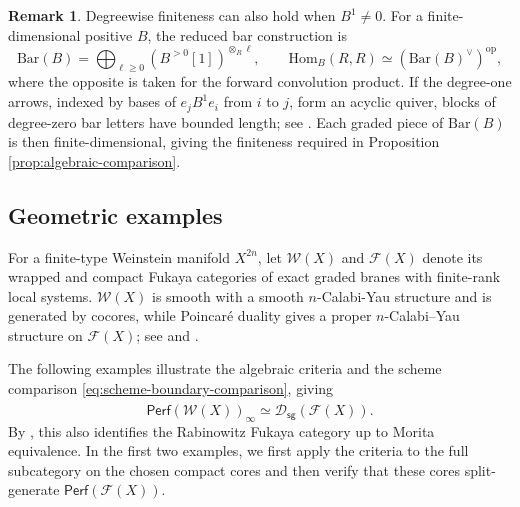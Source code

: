 \documentclass[11pt,letterpaper,reqno]{amsart}
\theoremstyle{plain}
\theoremstyle{definition}
\newtheorem{remark}[remark]{Remark}
\theoremstyle{plain}
\theoremstyle{definition}
\numberwithin{equation}{section}
\begin{document}
\begin{remark}\label{rem:bar-finiteness}
Degreewise finiteness can also hold when $B^1\ne0$.
For a finite-dimensional positive $B$, the reduced bar construction is
\[
\mathrm{Bar}(B)=\bigoplus_{\ell\geqslant0}(B^{>0}[1])^{\otimes_R\ell},\qquad
\mathrm{Hom}_B(R,R)\simeq(\mathrm{Bar}(B)^\vee)^{\mathrm{op}},
\]
where the opposite is taken for the forward convolution product.
If the degree-one arrows, indexed by bases of $e_jB^1e_i$ from $i$ to $j$, form an acyclic quiver, blocks of degree-zero bar letters have bounded length; see \cite[Section II.1 and Lemma II.1.4(c)]{Assem-Simson-Skowronski2006}.
Each graded piece of $\mathrm{Bar}(B)$ is then finite-dimensional, giving the finiteness required in Proposition \ref{prop:algebraic-comparison}.
\end{remark}



\subsection{Geometric examples}\label{subsec:geometric-examples}

For a finite-type Weinstein manifold $X^{2n}$, let $\mathscr W(X)$ and $\mathscr F(X)$ denote its wrapped and compact Fukaya categories of exact graded branes with finite-rank local systems.
$\mathscr W(X)$ is smooth with a smooth $n$-Calabi-Yau structure and is generated by cocores, while Poincar\'{e} duality gives a proper $n$-Calabi--Yau structure on $\mathscr F(X)$; see \cite{Ganatra2013,Ganatra-Pardon-Shende2024a,Chantraine-DimitroglouRizell-Ghiggini-Golovko2024} and \cite[Theorem 2]{Ganatra2023}.

The following examples illustrate the algebraic criteria and the scheme comparison \eqref{eq:scheme-boundary-comparison}, giving
\begin{equation}\label{eq:geometric-specialization}
\widehat{\mathsf{Perf}(\mathscr W(X))}_\infty
\simeq\mathscr D_{\mathsf{sg}}(\mathscr F(X)).
\end{equation}
By \cite[Theorem 1.1]{Ganatra-Gao-Venkatesh2022}, this also identifies the Rabinowitz Fukaya category up to Morita equivalence.
In the first two examples, we first apply the criteria to the full subcategory on the chosen compact cores and then verify that these cores split-generate $\mathsf{Perf}(\mathscr F(X))$.
\end{document}
